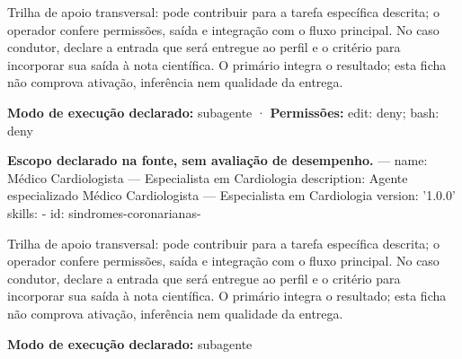 \begin{funcao}
Trilha de apoio transversal: pode contribuir para a tarefa específica descrita; o operador confere permissões, saída e integração com o fluxo principal. No caso condutor, declare a entrada que será entregue ao perfil e o critério para incorporar sua saída à nota científica. O primário integra o resultado; esta ficha não comprova ativação, inferência nem qualidade da entrega.
\end{funcao}

\begin{arquitetura}
\textbf{Modo de execução declarado:} subagente · \textbf{Permissões:} edit: deny; bash: deny
\end{arquitetura}


\begin{descricao}
\textbf{Escopo declarado na fonte, sem avaliação de desempenho.}
--- name: Médico Cardiologista — Especialista em Cardiologia description: Agente especializado Médico Cardiologista — Especialista em Cardiologia version: '1.0.0' skills: - id: sindromes-coronarianas-
\end{descricao}

\begin{funcao}
Trilha de apoio transversal: pode contribuir para a tarefa específica descrita; o operador confere permissões, saída e integração com o fluxo principal. No caso condutor, declare a entrada que será entregue ao perfil e o critério para incorporar sua saída à nota científica. O primário integra o resultado; esta ficha não comprova ativação, inferência nem qualidade da entrega.
\end{funcao}

\begin{arquitetura}
\textbf{Modo de execução declarado:} subagente
\end{arquitetura}


